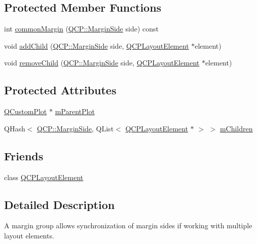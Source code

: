 \subsection*{Protected Member Functions}
\begin{DoxyCompactItemize}
\item 
int \hyperlink{class_q_c_p_margin_group_aeaeba9068dba2ef8be41449f0f2582f7}{common\+Margin} (\hyperlink{namespace_q_c_p_a7e487e3e2ccb62ab7771065bab7cae54}{Q\+C\+P\+::\+Margin\+Side} side) const 
\item 
void \hyperlink{class_q_c_p_margin_group_acb9c3a35acec655c2895b7eb95ee0524}{add\+Child} (\hyperlink{namespace_q_c_p_a7e487e3e2ccb62ab7771065bab7cae54}{Q\+C\+P\+::\+Margin\+Side} side, \hyperlink{class_q_c_p_layout_element}{Q\+C\+P\+Layout\+Element} $\ast$element)
\item 
void \hyperlink{class_q_c_p_margin_group_a20ab3286062957d99b58db683fe725b0}{remove\+Child} (\hyperlink{namespace_q_c_p_a7e487e3e2ccb62ab7771065bab7cae54}{Q\+C\+P\+::\+Margin\+Side} side, \hyperlink{class_q_c_p_layout_element}{Q\+C\+P\+Layout\+Element} $\ast$element)
\end{DoxyCompactItemize}
\subsection*{Protected Attributes}
\begin{DoxyCompactItemize}
\item 
\hyperlink{class_q_custom_plot}{Q\+Custom\+Plot} $\ast$ \hyperlink{class_q_c_p_margin_group_a23cfa29e3cc0f33a59141b77d8c04edf}{m\+Parent\+Plot}
\item 
Q\+Hash$<$ \hyperlink{namespace_q_c_p_a7e487e3e2ccb62ab7771065bab7cae54}{Q\+C\+P\+::\+Margin\+Side}, Q\+List$<$ \hyperlink{class_q_c_p_layout_element}{Q\+C\+P\+Layout\+Element} $\ast$ $>$ $>$ \hyperlink{class_q_c_p_margin_group_ac16957e388687100bfd10f68fb7baac8}{m\+Children}
\end{DoxyCompactItemize}
\subsection*{Friends}
\begin{DoxyCompactItemize}
\item 
class \hyperlink{class_q_c_p_margin_group_a0790750c7e7f14fdbd960d172655b42b}{Q\+C\+P\+Layout\+Element}
\end{DoxyCompactItemize}


\subsection{Detailed Description}
A margin group allows synchronization of margin sides if working with multiple layout elements. 

